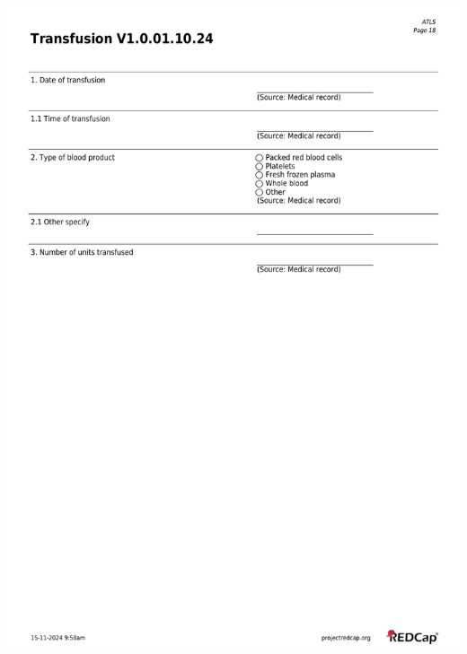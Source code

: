 \documentclass[
]{scrartcl}
\begin{document}
\includegraphics{../case-record-form/instrument-pdfs/pages/all-instruments-18.pdf}
\end{document}
